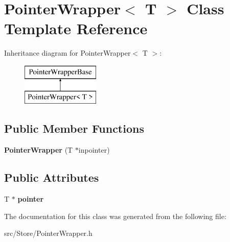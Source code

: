\hypertarget{classPointerWrapper}{\section{Pointer\-Wrapper$<$ T $>$ Class Template Reference}
\label{classPointerWrapper}
}
Inheritance diagram for Pointer\-Wrapper$<$ T $>$\-:\begin{figure}[H]
\begin{center}
\leavevmode
\includegraphics[height=2.000000cm]{classPointerWrapper}
\end{center}
\end{figure}
\subsection*{Public Member Functions}
\begin{DoxyCompactItemize}
\item 
\hypertarget{classPointerWrapper_aa645eb1963f91c9bddf5fd6ff578751b}{{\bfseries Pointer\-Wrapper} (T $\ast$inpointer)}\label{classPointerWrapper_aa645eb1963f91c9bddf5fd6ff578751b}

\end{DoxyCompactItemize}
\subsection*{Public Attributes}
\begin{DoxyCompactItemize}
\item 
\hypertarget{classPointerWrapper_a4866798d33eed0a9aeaa3bcda53c4a0d}{T $\ast$ {\bfseries pointer}}\label{classPointerWrapper_a4866798d33eed0a9aeaa3bcda53c4a0d}

\end{DoxyCompactItemize}


The documentation for this class was generated from the following file\-:\begin{DoxyCompactItemize}
\item 
src/\-Store/Pointer\-Wrapper.\-h\end{DoxyCompactItemize}
